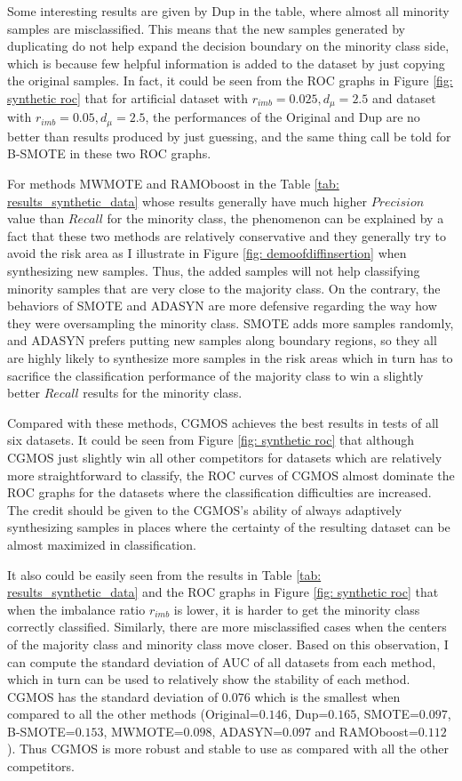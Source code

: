 \documentclass{iitthesis}
\begin{document}
Some interesting results are given by Dup in the table, where almost all minority samples are misclassified. This means that the new samples generated by duplicating do not help expand the decision boundary on the minority class side, which is because few helpful information is added to the dataset by just copying the original samples. In fact, it could be seen from the ROC graphs in Figure \ref{fig: synthetic roc} that for artificial dataset with $r_{imb}= 0.025, d_{\mu}=2.5$ and dataset with $r_{imb}=0.05, d_{\mu}=2.5$, the performances of the Original and Dup are no better than results produced by just guessing, and the same thing call be told for B-SMOTE in these two ROC graphs.

For methods MWMOTE and RAMOboost in the Table \ref{tab: results_synthetic_data} whose results generally have much higher $Precision$ value than $Recall$ for the minority class, the phenomenon can be explained by a fact that these two methods are relatively conservative and they generally try to avoid the risk area as I illustrate in Figure \ref{fig: demoofdiffinsertion} when synthesizing new samples. Thus, the added samples will not help classifying minority samples that are very close to the majority class. On the contrary, the behaviors of SMOTE and ADASYN are more defensive regarding the way how they were oversampling the minority class. SMOTE adds more samples randomly, and ADASYN prefers putting new samples along boundary regions, so they all are highly likely to synthesize more samples in the risk areas which in turn has to sacrifice the classification performance of the majority class to win a slightly better $Recall$ results for the minority class.

Compared with these methods, CGMOS achieves the best results in tests of all six datasets. It could be seen from Figure \ref{fig: synthetic roc} that although CGMOS just slightly win all other competitors for datasets which are relatively more straightforward to classify, the ROC curves of CGMOS almost dominate the ROC graphs for the datasets where the classification difficulties are increased. The credit should be given to the CGMOS's ability of always adaptively synthesizing samples in places where the certainty of the resulting dataset can be almost maximized in classification.

It also could be easily seen from the results in Table \ref{tab: results_synthetic_data} and the ROC graphs in Figure \ref{fig: synthetic roc} that when the imbalance ratio $r_{imb}$ is lower, it is harder to get the minority class correctly classified. Similarly, there are more misclassified cases when the centers of the majority class and minority class move closer. Based on this observation, I can compute the standard deviation of AUC of all datasets from each method, which in turn can be used to relatively show the stability of each method. CGMOS has the standard deviation of $0.076$ which is the smallest when compared to all the other methods (Original=$0.146$, Dup=$0.165$, SMOTE=$0.097$, B-SMOTE=$0.153$, MWMOTE=$0.098$, ADASYN=$0.097$ and RAMOboost=$0.112$). Thus CGMOS is more robust and stable to use as compared with all the other competitors.
\end{document}
